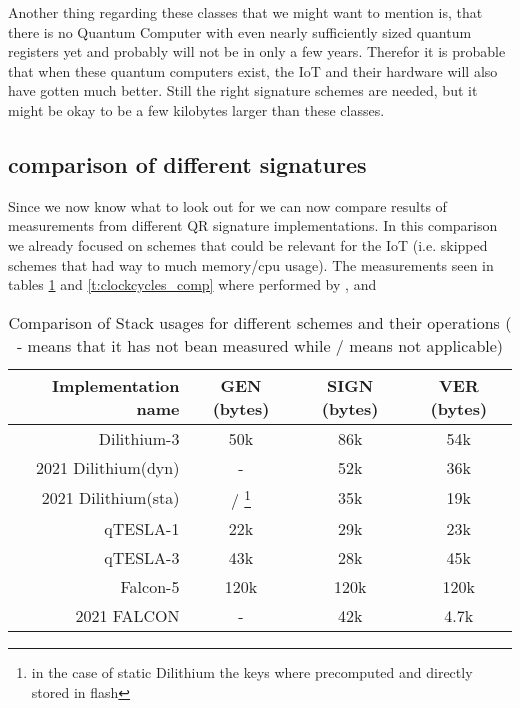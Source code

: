 \documentclass[conference]{IEEEtran}
\newcommand{\comment}[1]{}
\begin{document}
Another thing regarding these classes that we might want to mention is, that there is no Quantum Computer with even nearly sufficiently sized quantum registers yet and probably will not be in only a few years. Therefor it is probable that when these quantum computers exist, the IoT and their hardware will also have gotten much better. Still the right signature schemes are needed, but it might be okay to be a few kilobytes larger than these classes.  

\subsection{comparison of different signatures}
\comment{ %
Hash-Based Sphincs promising since stateless, but many parameters to set \cite{QR_IoT_Energy}

as of \cite{QR_comparison} only schemes (out of ~50) with < 4kbit: SIKE and Round5 
} %

Since we now know what to look out for we can now compare results of measurements from different QR signature implementations.
In this comparison we already focused on schemes that could be relevant for the IoT (i.e. skipped schemes that had way to much memory/cpu usage).
The measurements seen in tables \ref{t:stack_comp} and \ref{t:clockcycles_comp}
where performed by \cite{QR_comparison},\cite{Energy_comp} and \cite{update_sign}

\begin{table}%
    \caption{Comparison of Stack usages for different schemes and their operations ( - means that it has not bean measured while / means not applicable)}
    \label{t:stack_comp}
    \centering\begin{tabular}{| r | c c c |}
        \hline
        Implementation name                     & GEN (bytes) & SIGN (bytes) & VER (bytes)\\
        \hline
        Dilithium-3 \cite{QR_Iot_Lattice}       & 50k       & 86k   & 54k\\
        2021 Dilithium(dyn)\cite{update_sign}   & -         & 52k   & 36k\\
        2021 Dilithium(sta)\cite{update_sign}   & / \footnote{in the case of static Dilithium the keys where precomputed and directly stored in flash} & 35k   & 19k\\ %
        qTESLA-1 \cite{QR_Iot_Lattice}          & 22k       & 29k   & 23k\\
        qTESLA-3 \cite{QR_Iot_Lattice}          & 43k       & 28k   & 45k\\
        Falcon-5  \cite{QR_Iot_Lattice}         & 120k      & 120k  & 120k\\
        2021 FALCON \cite{update_sign}          & -         & 42k   & 4.7k\\
        \hline
    \end{tabular}
\end{table}
\end{document}
